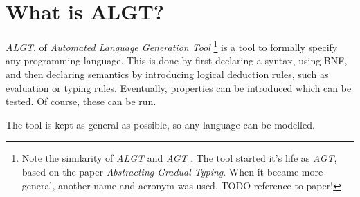 \section{What is ALGT?}\label{what-is-algt}

\emph{ALGT}, of \emph{Automated Language Generation Tool} \footnote{Note
  the similarity of \emph{ALGT} and \emph{AGT} . The tool started it's
  life as \emph{AGT}, based on the paper \emph{Abstracting Gradual
  Typing}. When it became more general, another name and acronym was
  used. TODO reference to paper!} is a tool to formally specify any
programming language. This is done by first declaring a syntax, using
BNF, and then declaring semantics by introducing logical deduction
rules, such as evaluation or typing rules. Eventually, properties can be
introduced which can be tested. Of course, these can be run.

The tool is kept as general as possible, so any language can be
modelled.
